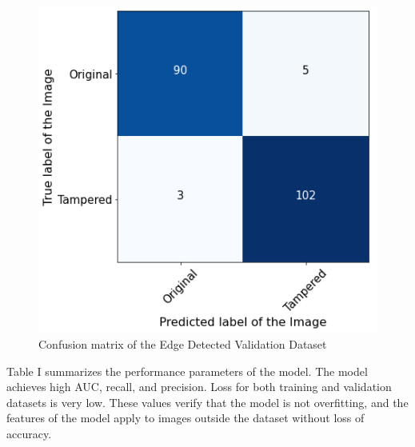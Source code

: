 \documentclass[conference]{IEEEtran}
\begin{document}
\begin{figure}[htpb]
\centerline{\includegraphics[scale=0.45]{confusion.png}}
\caption{Confusion matrix of the Edge Detected Validation Dataset}
\label{confusion}
\end{figure}

\begin{table}[htpb]
\caption{\label{tab:res}Performance metrics of the CNN model using the Edge Detected Dataset}
\centering
{}
\end{table}

Table I summarizes the performance parameters of the model. The model achieves high AUC, recall, and precision. Loss for both training and validation datasets is very low. These values verify that the model is not overfitting, and the features of the model apply to images outside the dataset without loss of accuracy. 
\end{document}
